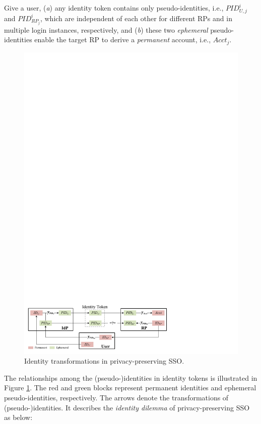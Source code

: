 Give a user,
    (\emph{a}) any identity token contains only pseudo-identities, i.e., $PID_{U,j}^i$ and $PID_{RP_j}^i$,
        which are independent of each other for different RPs and in multiple login instances, respectively,
    and (\emph{b}) these two \emph{ephemeral} pseudo-identities enable the target RP to derive a \emph{permanent} account, i.e., $Acct_j$.


\begin{figure}[tb]
  \centering
  \includegraphics[width=0.96\linewidth]{fig/IDCorrelation.pdf}
  \caption{Identity transformations in privacy-preserving SSO.}
  \label{fig:IDCorrelation}
\end{figure}

The relationships among the (pseudo-)identities in identity tokens is illustrated in Figure \ref{fig:IDCorrelation}.
The red and green blocks represent permanent identities and ephemeral pseudo-identities, respectively.
The arrows denote the transformations of (pseudo-)identities.
It describes the {\em identity dilemma} of privacy-preserving SSO as below:

